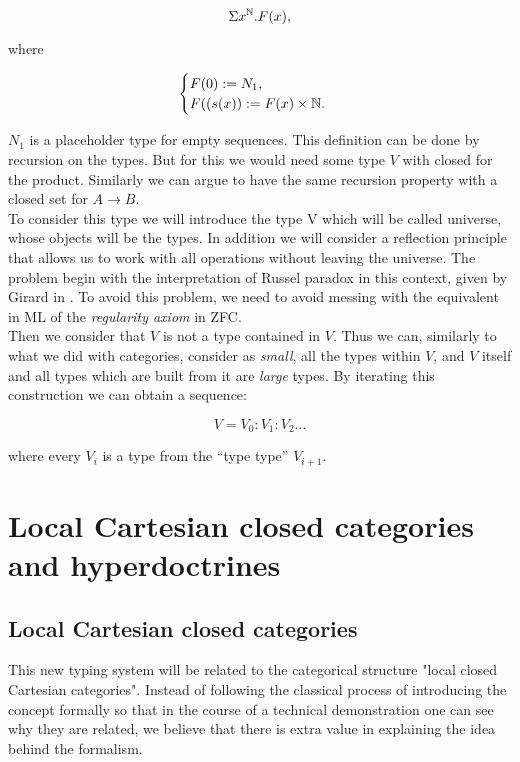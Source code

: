 $$\Sigma x^{\mathbb{N}}. F(x),$$

where

\[   
     \begin{cases}
       F(0):= N_1,\\
       F((s(x)):= F(x)\times \mathbb{N}.
     \end{cases}
\]

$N_1$ is a placeholder type for empty sequences. This definition can be done by recursion on the types. But for this we would need some type $V$ with closed for the product. Similarly we can argue to have the same recursion property with a closed set for $A \to B$.\\ 

To consider this type we will introduce the type V which will be called universe, whose objects will be the types. In addition we will consider a reflection principle that allows us to work with all operations without leaving the universe.  The problem begin with the interpretation of Russel paradox in this context, given by Girard in \cite{girard1972interpretation}. To avoid this problem, we need to avoid messing with the equivalent in ML of the \emph{regularity axiom} in ZFC.\\


Then we consider that $V$ is not a type contained in $V$. Thus we can, similarly to what we did with categories, consider as \emph{small}, all the types within $V$, and $V$ itself and all types which are built from it are \emph{large} types. By iterating this construction we can obtain a sequence:

$$V = V_0 : V_1 : V_2 ...$$

where every $V_i$ is a type from the ``type type'' $V_{i+1}$. 


\section{Local Cartesian closed categories and hyperdoctrines}
\subsection{Local Cartesian closed categories}
This new typing system will be related to the categorical structure "local closed Cartesian categories". Instead of following the classical process of introducing the concept formally so that in the course of a technical demonstration one can see why they are related, we believe that there is extra value in explaining the idea behind the formalism.\\


